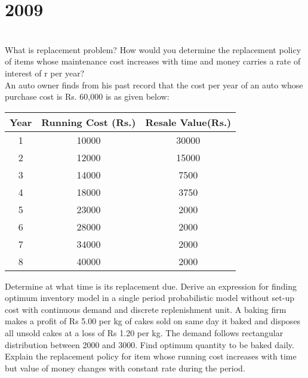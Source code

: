 \section*{2009}
\vspace{-.5cm}
\hrulefill \smallskip\\
 What is replacement problem? How would you determine the replacement policy of items whose maintenance cost increases with time and money carries a rate of interest of r per year?\\ An auto owner finds from his past record that the cost per year of an auto whose purchase cost is Rs. 60,000 is as given below:
\begin{center}
    \begin{tabular}{*{3}{c}}\hline
    Year & Running Cost (Rs.) & Resale Value(Rs.) \\ \hline
    1 & 10000 & 30000 \\ 
    2 & 12000 & 15000 \\
    3 & 14000 & 7500 \\
    4 & 18000 & 3750 \\
    5 & 23000 & 2000 \\
    6 & 28000 & 2000 \\
    7 & 34000 & 2000 \\
    8 & 40000 & 2000 \\ \hline
    \end{tabular}
\end{center} Determine at what time is its replacement due.
\myline
{} Derive an expression for finding optimum inventory model in  a single period probabilistic model without set-up cost with continuous demand and discrete replenishment unit.
A baking firm makes a profit of Rs 5.00 per kg of cakes sold on same day it baked and disposes all unsold cakes at a loss of Rs 1.20 per kg. The demand follows rectangular distribution between 2000 and 3000. Find optimum quantity to be baked daily.
\myline
{} Explain the replacement policy for item whose running cost increases with time but value of money changes with constant rate during the period.